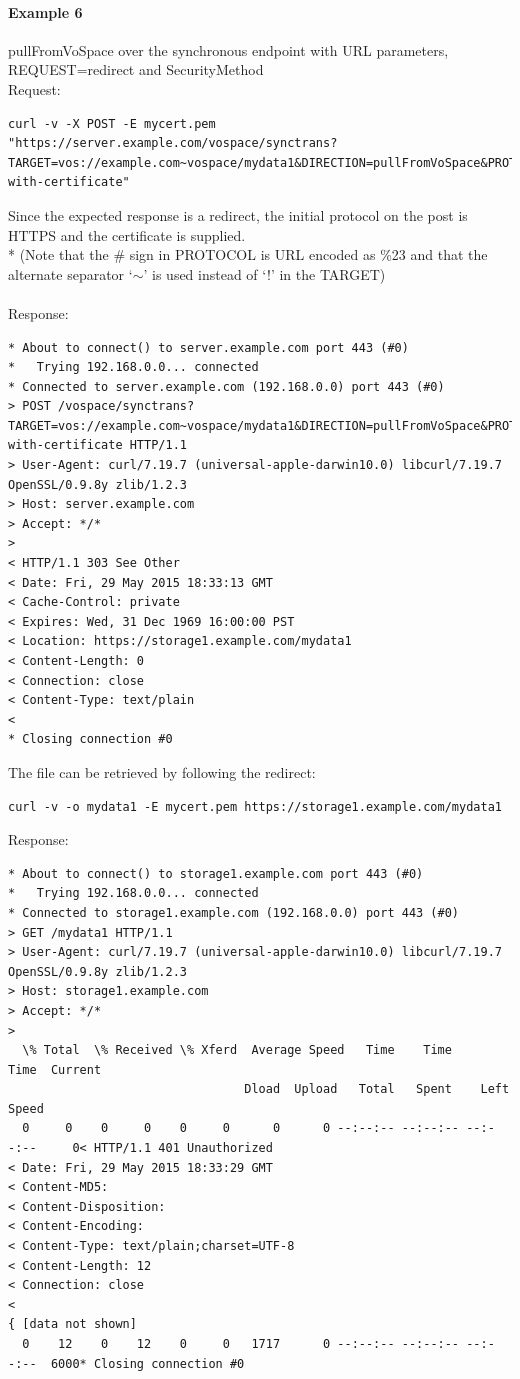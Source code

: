 \documentclass[11pt,a4paper]{ivoa}
\begin{document}
\paragraph{Example 6}
pullFromVoSpace over the synchronous endpoint with URL parameters, REQUEST=redirect and SecurityMethod
\\[5px]
\noindent
Request:
\begin{lstlisting}
curl -v -X POST -E mycert.pem "https://server.example.com/vospace/synctrans?TARGET=vos://example.com~vospace/mydata1&DIRECTION=pullFromVoSpace&PROTOCOL=ivo://ivoa.net/vospace/core%23httpsget&REQUEST=redirect&SECURITYMETHOD=ivo://ivoa.net/sso%23tls-with-certificate"
\end{lstlisting}
Since the expected response is a redirect, the initial protocol on the post is HTTPS and the certificate is supplied.\\*
(Note that the \# sign in PROTOCOL is URL encoded as \%23 and that the alternate separator `$\mathtt{\sim}$' is used instead of `!' in the TARGET) \\
\\
Response:
\begin{lstlisting}
* About to connect() to server.example.com port 443 (#0)
*   Trying 192.168.0.0... connected
* Connected to server.example.com (192.168.0.0) port 443 (#0)
> POST /vospace/synctrans?TARGET=vos://example.com~vospace/mydata1&DIRECTION=pullFromVoSpace&PROTOCOL=ivo://ivoa.net/vospace/core\%23httpget&REQUEST=redirect&SECURITYMETHOD=ivo://ivoa.net/sso%23tls-with-certificate HTTP/1.1
> User-Agent: curl/7.19.7 (universal-apple-darwin10.0) libcurl/7.19.7 OpenSSL/0.9.8y zlib/1.2.3
> Host: server.example.com
> Accept: */*
>
< HTTP/1.1 303 See Other
< Date: Fri, 29 May 2015 18:33:13 GMT
< Cache-Control: private
< Expires: Wed, 31 Dec 1969 16:00:00 PST
< Location: https://storage1.example.com/mydata1
< Content-Length: 0
< Connection: close
< Content-Type: text/plain
<
* Closing connection #0
\end{lstlisting}
The file can be retrieved by following the redirect:
\begin{lstlisting}
curl -v -o mydata1 -E mycert.pem https://storage1.example.com/mydata1
\end{lstlisting}
Response:
\begin{lstlisting}
* About to connect() to storage1.example.com port 443 (#0)
*   Trying 192.168.0.0... connected
* Connected to storage1.example.com (192.168.0.0) port 443 (#0)
> GET /mydata1 HTTP/1.1
> User-Agent: curl/7.19.7 (universal-apple-darwin10.0) libcurl/7.19.7 OpenSSL/0.9.8y zlib/1.2.3
> Host: storage1.example.com
> Accept: */*
>
  \% Total  \% Received \% Xferd  Average Speed   Time    Time     Time  Current
                                 Dload  Upload   Total   Spent    Left  Speed
  0     0    0     0    0     0      0      0 --:--:-- --:--:-- --:--:--     0< HTTP/1.1 401 Unauthorized
< Date: Fri, 29 May 2015 18:33:29 GMT
< Content-MD5:
< Content-Disposition:
< Content-Encoding:
< Content-Type: text/plain;charset=UTF-8
< Content-Length: 12
< Connection: close
<
{ [data not shown]
  0    12    0    12    0     0   1717      0 --:--:-- --:--:-- --:--:--  6000* Closing connection #0
\end{lstlisting}
\end{document}
